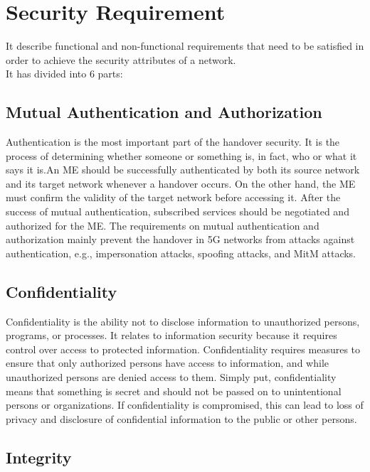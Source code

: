 \section{Security Requirement}
{
    It describe functional and non-functional requirements that need to be satisfied 
    in order to achieve the security attributes of a network.\\
    It has divided into 6 parts:
    \subsection{Mutual Authentication and Authorization}{
        Authentication is the most important part of the handover security. It is 
        the process of determining whether someone or something is, in fact, who 
        or what it says it is.An ME should be successfully authenticated by both 
        its source network and its target network whenever a handover occurs. On 
        the other hand, the ME must confirm the validity of the target network
        before accessing it. After the success of mutual authentication,
        subscribed services should be negotiated and authorized for the
        ME. The requirements on mutual authentication and authorization
        mainly prevent the handover in 5G networks from attacks
        against authentication, e.g., impersonation attacks, spoofing
        attacks, and MitM attacks.
    }

    \subsection{Confidentiality}{
        Confidentiality is the ability not to disclose information to unauthorized 
        persons, programs, or processes. It relates to information security 
        because it requires control over access to protected information. 
        Confidentiality requires measures to ensure that only authorized 
        persons have access to information, and while unauthorized persons 
        are denied access to them. Simply put, confidentiality means that 
        something is secret and should not be passed on to unintentional persons 
        or organizations. If confidentiality is compromised, this can lead to 
        loss of privacy and disclosure of confidential information to the public 
        or other persons. 
    }
    \subsection{Integrity}{

}}
